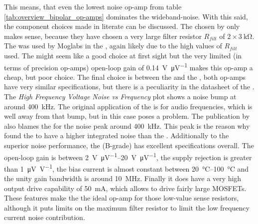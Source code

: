 This means, that even the lowest noise op-amp from table \ref{tab:overview_bipolar_op-amps} dominates the wideband-noise. With this said, the component choices made in literate can be discussed. The  chosen by \cite{laser_driver_digital} only makes sense, because they have chosen a very large filter resistor $R_{filt}$ of $2 \times \qty{3}{\kilo\ohm}$. The  was used by Moglabs in the , again likely due to the high values of $R_{filt}$ used. The  might seem like a good choice at first sight but the very limited (in terms of precision op-amps) open-loop gain of \qty{0.14}{\V \per \uV} makes this op-amp a cheap, but poor choice. The final choice is between the  and the , both op-amps have very similar specifications, but there is a peculiarity in the datasheet of the  \cite{datasheet_LT1028}. The \textit{High Frequency Voltage Noise
vs Frequency} plot shows a noise bump at around \qty{400}{\kHz}. The original application of the  is for audio frequencies, which is well away from that bump, but in this case poses a problem. The publication by \citeauthor{libbrecht_hall} also blames the  for the noise peak around \qty{400}{\kHz}. This peak is the reason why \citeauthor{laser_driver_mosfet_noise} found the  to have a higher integrated noise than the . Additionally to the superior noise performance, the  (B-grade) has excellent specifications overall. The open-loop gain is between \qtyrange[range-units = single]{2}{20}{\V \per \uV}, the supply rejection is greater than \qty{1}{\uV \per \V}, the bias current is almost constant between \qtyrange[range-units = single]{20}{100}{\celsius} and the unity gain bandwidth is around \qty{10}{\MHz}. Finally it does have a very high output drive capability of \qty{50}{\mA}, which allows to drive fairly large MOSFETs. These features make the  the ideal op-amp for those low-value sense resistors, although it puts limits on the maximum filter resistor to limit the low frequency current noise contribution.

